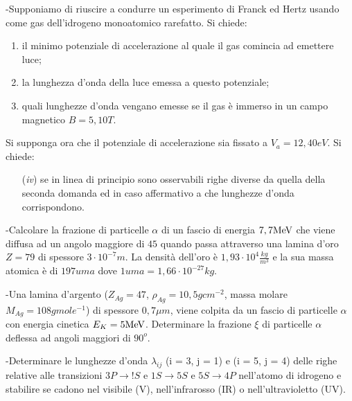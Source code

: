 \documentclass[12pt,twoside,a4]{article}
\begin{document}
\begin{esercizio}
	-Supponiamo di riuscire a condurre un esperimento di Franck ed Hertz usando come gas dell'idrogeno monoatomico rarefatto. Si chiede:
	\begin{enumerate}[label=(\textit{\roman*})]
		\item il minimo potenziale di accelerazione al quale il gas comincia ad emettere luce;
		\item la lunghezza d'onda della luce emessa a questo potenziale;
		\item quali lunghezze d'onda vengano emesse se il gas è immerso in un campo magnetico $B=5,10 T$.
	\end{enumerate}
	Si supponga ora che il potenziale di accelerazione sia fissato a $V_a=12,40 eV$. Si chiede:
	\begin{enumerate}[label=(\textit{\roman*})]
		\item[(\textit{iv})] se in linea di principio sono osservabili righe diverse da quella della seconda domanda ed in caso affermativo a che lunghezze d'onda corrispondono.
	\end{enumerate}
\end{esercizio}

\newpage
\begin{esercizio}
	-Calcolare la frazione di particelle $\alpha$ di un fascio di energia $7,7 \mathrm{MeV}$ che viene diffusa ad un angolo maggiore di $45$ quando passa attraverso una lamina d'oro $Z=79$ di spessore $3 \cdot 10^{-7}m$. La densità  dell'oro è $1,93 \cdot 10^4 \frac{kg}{m^3}$ e la sua massa atomica è di $197 uma$ dove $1 uma= 1,66 \cdot 10^{-27}kg$.
\end{esercizio}

\begin{esercizio}
	-Una lamina d'argento ($Z_{Ag} = 47$, $\rho_{Ag} = 10,5 g cm^{-2}$, massa molare $M_{Ag} = 108 g mole^{-1}$) di spessore $0,7 \mu m$, viene colpita da un fascio di particelle $\alpha$ con energia cinetica $E_K = 5 \mathrm{MeV}$. Determinare la frazione $\xi$ di particelle $\alpha$ deflessa ad angoli maggiori di $90^o$.
\end{esercizio}

\begin{esercizio}
	-Determinare le lunghezze d'onda $\lambda_{ij}$ (i = 3, j = 1) e (i = 5, j = 4) delle righe relative alle transizioni $3P \rightarrow !S$ e $1S \rightarrow 5S$ e $5S \rightarrow 4P$ nell'atomo di idrogeno e stabilire se cadono nel visibile (V), nell'infrarosso (IR) o nell'ultravioletto (UV).
\end{esercizio}
\end{document}
